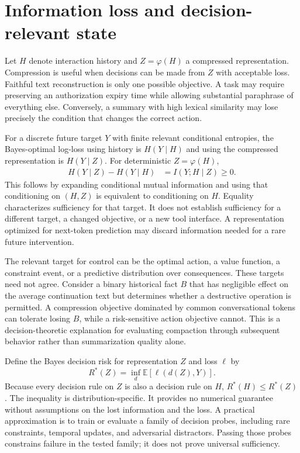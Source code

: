 \section{Information loss and decision-relevant state}\label{sec:C02:02}
Let $H$ denote interaction history and $Z=\varphi(H)$ a compressed representation. Compression is useful when decisions can be made from $Z$ with acceptable loss. Faithful text reconstruction is only one possible objective. A task may require preserving an authorization expiry time while allowing substantial paraphrase of everything else. Conversely, a summary with high lexical similarity may lose precisely the condition that changes the correct action.

For a discrete future target $Y$ with finite relevant conditional entropies, the Bayes-optimal log-loss using history is $H(Y\mid H)$ and using the compressed representation is $H(Y\mid Z)$. For deterministic $Z=\varphi(H)$,
\begin{align}
 H(Y\mid Z)-H(Y\mid H)
 &=I(Y;H\mid Z)\geq0.
 \label{eq:c02:informationgap}
\end{align}
This follows by expanding conditional mutual information and using that conditioning on $(H,Z)$ is equivalent to conditioning on $H$. Equality characterizes sufficiency for that target. It does not establish sufficiency for a different target, a changed objective, or a new tool interface. A representation optimized for next-token prediction may discard information needed for a rare future intervention.

The relevant target for control can be the optimal action, a value function, a constraint event, or a predictive distribution over consequences. These targets need not agree. Consider a binary historical fact $B$ that has negligible effect on the average continuation text but determines whether a destructive operation is permitted. A compression objective dominated by common conversational tokens can tolerate losing $B$, while a risk-sensitive action objective cannot. This is a decision-theoretic explanation for evaluating compaction through subsequent behavior rather than summarization quality alone.

Define the Bayes decision risk for representation $Z$ and loss $\ell$ by
\begin{equation}
 R^*(Z)=\inf_d\mathbb E[\ell(d(Z),Y)].
\end{equation}
Because every decision rule on $Z$ is also a decision rule on $H$, $R^*(H)\leq R^*(Z)$. The inequality is distribution-specific. It provides no numerical guarantee without assumptions on the lost information and the loss. A practical approximation is to train or evaluate a family of decision probes, including rare constraints, temporal updates, and adversarial distractors. Passing those probes constrains failure in the tested family; it does not prove universal sufficiency.

